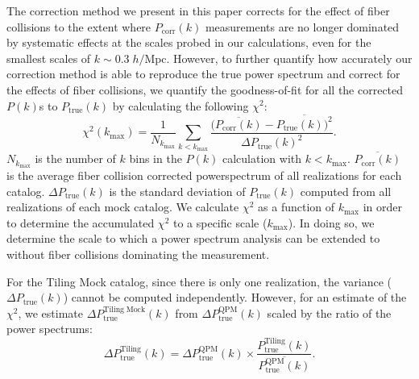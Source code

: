 \documentclass{emulateapj}
\begin{document}
The correction method we present in this paper corrects for the effect of fiber collisions to the extent where $P_\mathrm{corr}(k)$ measurements are no longer dominated by systematic effects at the scales probed in our calculations, even for the smallest scales of $k \sim 0.3 \; h/\mathrm{Mpc}$. However, to further quantify how accurately our correction method is able to reproduce the true power spectrum and correct for the effects of fiber collisions, we quantify the goodness-of-fit for all the corrected $P(k)$s to $P_\mathrm{true}(k)$ by calculating the following $\chi^2$: 
\begin{equation}
\chi^2 (k_\mathrm{max}) = \frac{1}{N_{k_\mathrm{max}}} \sum\limits_{k< k_\mathrm{max}} \frac{(\overline{P_\mathrm{corr}(k)} - \overline{P_\mathrm{true}(k))^2}}{\Delta P_\mathrm{true} (k)^2}. \label{eq:chi2}
\end{equation}
$N_{k_\mathrm{max}}$ is the number of $k$ bins in the $P(k)$ calculation with $k < k_\mathrm{max}$. $\overline{P_\mathrm{corr}(k)}$ is the average fiber collision corrected powerspectrum of all realizations for each catalog. $\Delta P_\mathrm{true}(k)$ is the standard deviation of $P_\mathrm{true}(k)$ computed from all realizations of each mock catalog. We calculate $\chi^2$ as a function of $k_\mathrm{max}$ in order to determine the accumulated $\chi^2$ to a specific scale ($k_\mathrm{max}$). In doing so, we determine the scale to which a power spectrum analysis can be extended to without fiber collisions dominating the measurement. 

For the Tiling Mock catalog, since there is only one realization, the variance ($\Delta P_\mathrm{true} (k)$) cannot be computed independently. However, for an estimate of the $\chi^2$, we estimate $\Delta P_\mathrm{true}^\mathrm{Tiling\;Mock}(k)$ from $\Delta P^\mathrm{QPM}_\mathrm{true} (k)$ scaled by the ratio of the power spectrums:
\begin{equation}
\Delta P_\mathrm{true}^\mathrm{Tiling}(k) = \Delta P_\mathrm{true}^\mathrm{QPM}(k) \times \frac{P_\mathrm{true}^\mathrm{Tiling}(k)}{\overline{P^\mathrm{QPM}_\mathrm{true}(k)}}.
\end{equation}
\end{document}
